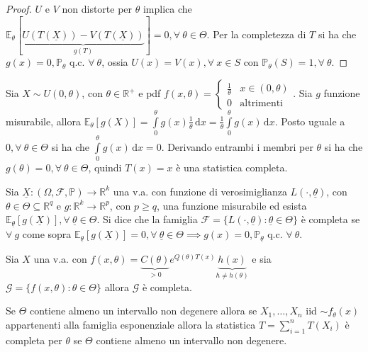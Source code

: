 \documentclass[hidelinks, 10pt]{report}
\begin{document}
\begin{proof}
$ U $ e $ V $ non distorte per $ \theta $ implica che $ \mathbb{E}_{\theta} [\underbrace{U(T(\underline{X})) - V(T(\underline{X}))}_{g(T)}] = 0, \forall\ \theta \in \Theta $. Per la completezza di $ T $ si ha che $ g(x) = 0, \mathbb{P}_{\theta} $ q.c. $ \forall\ \theta $, ossia $ U(x) = V(x), \forall\ x \in S $ con $ \mathbb{P}_{\theta} (S) = 1, \forall\ \theta $.
\end{proof}

\begin{es}
Sia $ X \sim U(0, \theta) $, con $ \theta \in \mathbb{R}^{+} $ e pdf $ f(x, \theta) = \begin{cases} \frac{1}{\theta} & x \in (0, \theta) \\ 0 & \text{altrimenti} \end{cases} $. Sia $ g $ funzione misurabile, allora $ \mathbb{E}_{\theta} [g(X)] = \int\limits_{0}^{\theta} g(x) \frac{1}{\theta} \, \mathrm{d}x = \frac{1}{\theta} \int\limits_{0}^{\theta} g(x) \, \mathrm{d}x $. Posto uguale a $ 0, \forall\ \theta \in \Theta $ si ha che $ \int\limits_{0}^{\theta} g(x) \, \mathrm{d}x = 0 $. Derivando entrambi i membri per $ \theta $ si ha che $ g(\theta) = 0, \forall\ \theta \in \Theta $, quindi $ T(x) = x $ \`e una statistica completa. 
\end{es}

\begin{defn}
Sia $ \underline{X}: (\Omega, \mathcal{F}, \mathbb{P}) \to \mathbb{R}^k $ una v.a. con funzione di verosimiglianza $ L(\cdot, \underline{\theta}) $, con $ \theta \in \Theta \subseteq \mathbb{R}^q $ e $ g: \mathbb{R}^k \to \mathbb{R}^p $, con $ p \ge q $, una funzione misurabile ed esista $ \mathbb{E}_{\underline{\theta}} [g(\underline{X})], \forall\ \underline{\theta} \in \Theta $. Si dice che la famiglia $ \mathcal{F} = \{ L(\cdot, \underline{\theta}) : \underline{\theta} \in \Theta \} $ \`e completa se $ \forall\ g $ come sopra $ \mathbb{E}_{\underline{\theta}} [g(\underline{X})] = 0, \forall\ \underline{\theta} \in \Theta \implies g(x) = 0, \mathbb{P}_{\underline{\theta}} $ q.c. $ \forall\ \theta $.
\end{defn}

\begin{thm}
Sia $ X $ una v.a. con $ f(x, \theta) = \underbrace{C(\theta)}_{> 0} e^{Q(\theta) T(x)} \underbrace{h(x)}_{h \ne h(\theta)} $ e sia $ \mathcal{G} = \{ f(x, \theta) : \theta \in \Theta \} $ allora $ \mathcal{G} $ \`e completa.

Se $ \Theta $ contiene almeno un intervallo non degenere allora se $ X_1, \dotsc, X_n $ iid $ \sim f_{\theta} (x) $ appartenenti alla famiglia esponenziale allora la statistica $ T = \sum\limits_{i = 1}^{n} T(X_i) $ \`e completa per $ \theta $ se $ \Theta $ contiene almeno un intervallo non degenere.
\end{thm}
\end{document}
